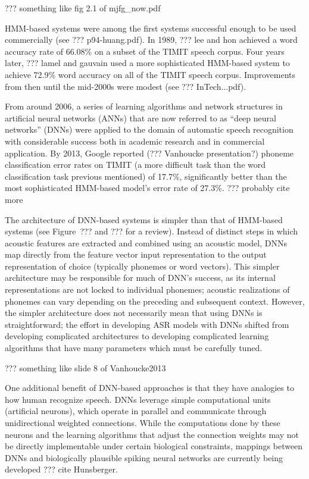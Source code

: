 ??? something like fig 2.1 of mjfg_now.pdf

HMM-based systems
were among the first systems
successful enough to be
used commercially
(see ??? p94-huang.pdf).
In 1989, ??? lee and hon
achieved a word accuracy rate of
66.08\% on a subset of the
TIMIT speech corpus.
Four years later,
??? lamel and gauvain
used a more sophisticated HMM-based system
to achieve 72.9\% word accuracy on
all of the TIMIT speech corpus.
Improvements from then until
the mid-2000s were modest
(see ??? InTech...pdf).

From around 2006, a series of learning algorithms
and network structures in artificial neural networks (ANNs)
that are now referred to as ``deep neural networks'' (DNNs)
were applied to
the domain of automatic speech recognition
with considerable success
both in academic research
and in commercial application.
By 2013, Google reported
(??? Vanhoucke presentation?)
phoneme classification error rates on TIMIT
(a more difficult task than
the word classification task previous mentioned)
of 17.7\%,
significantly better than the most sophisticated
HMM-based model's error rate of 27.3\%.
??? probably cite more

The architecture of DNN-based systems
is simpler than that of HMM-based systems
(see Figure~??? and ??? for a review).
Instead of distinct steps in which
acoustic features are extracted
and combined using an acoustic model,
DNNs map directly from the
feature vector input representation
to the output representation of choice
(typically phonemes or word vectors).
This simpler architecture may be
responsible for much of DNN's success,
as its internal representations
are not locked to individual phonemes;
acoustic realizations
of phonemes can vary depending on
the preceding and subsequent context.
However, the simpler architecture
does not necessarily mean that
using DNNs is straightforward;
the effort in developing ASR models
with DNNs shifted from
developing complicated architectures
to developing complicated learning algorithms
that have many parameters
which must be carefully tuned.

??? something like slide 8 of Vanhoucke2013

One additional benefit of DNN-based approaches
is that they have analogies to
how human recognize speech.
DNNs leverage simple computational units
(artificial neurons),
which operate in parallel
and communicate through unidirectional
weighted connections.
While the computations done by these neurons
and the learning algorithms that adjust
the connection weights
may not be directly implementable
under certain biological constraints,
mappings between DNNs
and biologically plausible spiking neural networks
are currently being developed
??? cite Hunsberger.

